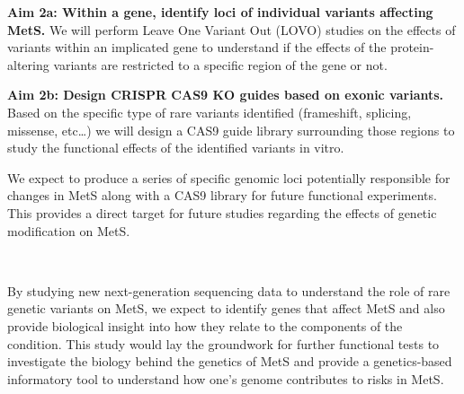 \documentclass[11pt]{article}
\begin{document}
\textbf{Aim 2a: Within a gene, identify loci of individual variants affecting MetS.} We will perform Leave One Variant Out (LOVO) studies on the effects of variants within an implicated gene to understand if the effects of the protein-altering variants are restricted to a specific region of the gene or not.

\textbf{Aim 2b: Design CRISPR CAS9 KO guides based on exonic variants.} Based on the specific type of rare variants identified (frameshift, splicing, missense, etc…) we will design a CAS9 guide library surrounding those regions to study the functional effects of the identified variants in vitro.

We expect to produce a series of specific genomic loci potentially responsible for changes in MetS along with a CAS9 library for future functional experiments. This provides a direct target for future studies regarding the effects of genetic modification on MetS.

\

By studying new next-generation sequencing data to understand the role of rare genetic variants on MetS, we expect to identify genes that affect MetS and also provide biological insight into how they relate to the components of the condition. This study would lay the groundwork for further functional tests to investigate the biology behind the genetics of MetS and provide a genetics-based informatory tool to understand how one's genome contributes to risks in MetS.


\newpage

 

\end{document}
